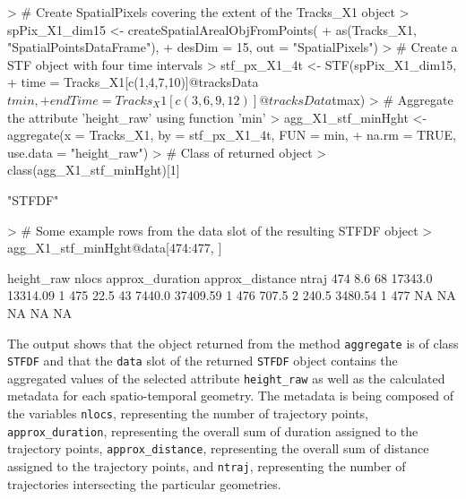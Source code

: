 \documentclass[12pt, oneside, a4paper]{scrbook}
\let\code=\texttt
\begin{document}
\begin{small}
\begin{Schunk}
\begin{Sinput}
> # Create SpatialPixels covering the extent of the Tracks_X1 object
> spPix_X1_dim15 <- createSpatialArealObjFromPoints(
+   as(Tracks_X1, "SpatialPointsDataFrame"), 
+   desDim = 15, out = "SpatialPixels")
> # Create a STF object with four time intervals
> stf_px_X1_4t <- STF(spPix_X1_dim15,
+                     time = Tracks_X1[c(1,4,7,10)]@tracksData$tmin,
+                     endTime = Tracks_X1[c(3,6,9,12)]@tracksData$tmax)
> # Aggregate the attribute 'height_raw' using function 'min'
> agg_X1_stf_minHght <- aggregate(x = Tracks_X1, by = stf_px_X1_4t, FUN = min,
+                                 na.rm = TRUE, use.data = "height_raw")
> # Class of returned object
> class(agg_X1_stf_minHght)[1]
\end{Sinput}
\begin{Soutput}
[1] "STFDF"
\end{Soutput}
\begin{Sinput}
> # Some example rows from the data slot of the resulting STFDF object
> agg_X1_stf_minHght@data[474:477, ]
\end{Sinput}
\begin{Soutput}
    height_raw nlocs approx_duration approx_distance ntraj
474        8.6    68         17343.0        13314.09     1
475       22.5    43          7440.0        37409.59     1
476      707.5     2           240.5         3480.54     1
477         NA    NA              NA              NA    NA
\end{Soutput}
\end{Schunk}
\end{small}

\par\medskip

The output shows that the object returned from the method \code{aggregate} is of class \code{STFDF} and that the \code{data} slot of the returned \code{STFDF} object contains the aggregated values of the selected attribute \code{height\_raw} as well as the calculated metadata for each spatio-temporal geometry. 
The metadata is being composed of the variables \code{nlocs}, representing the number of trajectory points, \code{approx\_duration}, representing the overall sum of duration assigned to the trajectory points, \code{approx\_distance}, representing the overall sum of distance assigned to the trajectory points, and \code{ntraj}, representing the number of trajectories intersecting the particular geometries. 
\par\medskip
\end{document}
